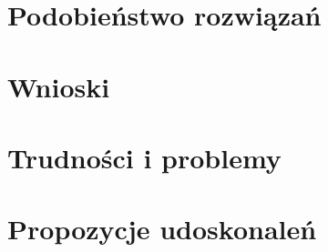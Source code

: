\documentclass{article}
\begin{document}
\section{Podobieństwo rozwiązań}
\section{Wnioski}

\section{Trudności i problemy}

\section{Propozycje udoskonaleń}

\clearpage



\end{document}
